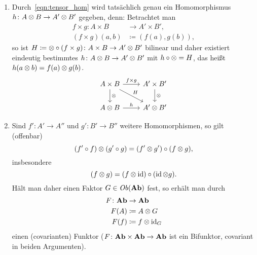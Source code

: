 \begin{kommentar}
  \begin{enumerate}
    \item
      Durch~\eqref{eqn:tensor_hom} wird tatsächlich genau ein Homomorphismus $h \colon A \otimes B \to A' \otimes B'$ gegeben, denn:
      Betrachtet man
      \begin{align*}
        f \times g \colon A \times B & \to A' \times B', \\
        (f \times g) (a,b) & \coloneqq (f(a),g(b)),
      \end{align*}
      so ist $H \coloneqq \otimes \circ (f \times g) \colon A \times B \to A' \otimes B'$ bilinear und daher existiert eindeutig bestimmtes $h \colon A \otimes B \to A' \otimes B'$ mit $h \circ \otimes = H$, das heißt $h(a \otimes b) = f(a) \otimes g(b)$.
      \begin{equation*}
        \begin{tikzcd}
          A \times B
            \arrow{r}{f \times g}
            \arrow{d}{\tensor}
            \arrow{dr}{H}
          & A' \times B'
            \arrow{d}{\tensor}
          \\
          A \tensor B
            \arrow{r}{h}
          & A' \tensor B'
        \end{tikzcd}
      \end{equation*}
    \item
      Sind $f' \colon A' \to A''$ und $g' \colon B' \to B''$ weitere Homomorphismen, so gilt (offenbar)
      \begin{equation*}
        (f' \circ f) \otimes (g' \circ g) = (f' \otimes g') \circ (f \otimes g),
      \end{equation*}
      insbesondere
      \begin{equation*}
        (f \otimes g) = (f \otimes \operatorname{id}) \circ (\operatorname{id} \otimes g).
      \end{equation*}
      Hält man daher einen Faktor $G \in \mathit{Ob}(\mathbf{Ab})$ fest, so erhält man durch
      \begin{align*}
        F \colon \mathbf{Ab} & \to \mathbf{Ab}\\
        F(A) & \coloneqq A \otimes G \\
        F(f) & \coloneqq f \otimes \operatorname{id}_G
      \end{align*}
      einen (covarianten) Funktor ($F\colon \mathbf{Ab} \times \mathbf{Ab} \to \mathbf{Ab}$ ist ein Bifunktor, covariant in beiden Argumenten).
  \end{enumerate}
\end{kommentar}

